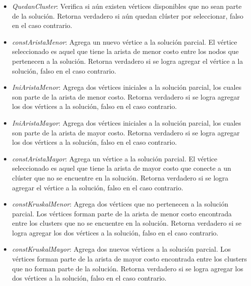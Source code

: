 \begin{itemize}

\item \textit{QuedanCluster}: Verifica si aún existen vértices disponibles que no sean parte de la solución. Retorna verdadero si aún quedan clúster por seleccionar, falso en el caso contrario.


\item \textit{constAristaMenor}: Agrega un nuevo vértice a la solución parcial. El vértice seleccionado es aquel que tiene la arista de menor costo entre los nodos que pertenecen a la solución. Retorna verdadero si se logra agregar el  vértice a la solución, falso en el caso contrario.

\item \textit{IniAristaMenor}: Agrega dos vértices iniciales a la solución parcial, los cuales son parte de la arista de menor costo. Retorna verdadero si se logra agregar los dos vértices a la solución, falso en el caso contrario.

\item \textit{IniAristaMayor}: Agrega dos vértices iniciales a la solución parcial, los cuales son parte de la arista de mayor costo. Retorna verdadero si se logra agregar los dos vértices a la solución, falso en el caso contrario.

\item \textit{constAristaMayor}: Agrega un vértice a la solución parcial. El vértice seleccionado es aquel que tiene la arista de mayor costo que conecte a un clúster que no se encuentre en la solución. Retorna verdadero si se logra agregar el  vértice a la solución, falso en el caso contrario.

\item \textit{constKruskalMenor}: Agrega dos vértices que no pertenecen a la solución parcial. Los vértices forman parte de la arista de menor costo encontrada entre los clusters que no se encuentre en la solución. Retorna verdadero si se logra agregar los dos vértices a la solución, falso en el caso contrario.

\item \textit{constKruskalMayor}: Agrega dos nuevos vértices a la solución parcial. Los vértices forman parte de la arista de mayor costo encontrada entre los clusters que no forman parte de la solución. Retorna verdadero si se logra agregar los dos vértices a la solución, falso en el caso contrario.

\end{itemize}

